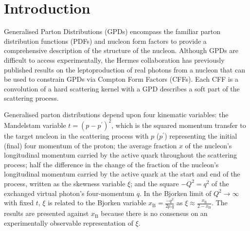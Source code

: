\section{Introduction}
Generalised Parton Distributions (GPDs)
\cite{Mueller1994,Ji1997a,Radyushkin1996} encompass the familiar parton
distribution functions (PDFs) and nucleon form factors to provide a
comprehensive description of the structure of the nucleon.
Although GPDs are difficult to access experimentally, the H{\sc ermes}
collaboration has previously published results
\cite{2009a,2010,CollaborationPhys.Rev.D75:0111032007,HERMEScollaboration2010,HERMESCollaborationPhys.Rev.Lett.87:1820012001} on
the leptoproduction of real photons from a nucleon that can be used to
constrain GPDs via Compton Form Factors (CFFs). Each CFF is a convolution of a
hard scattering kernel with a GPD  describes a soft part of the scattering
process.

Generalised parton distributions depend upon four kinematic variables: the
Mandelstam variable $t=(p-p^{\prime})^2$, which is the squared momentum
transfer to the target nucleon in the scattering process with $p$ ($p^{\prime}$)
representing the initial (final) four momentum of the proton; the average
fraction $x$ of the nucleon's longitudinal momentum carried by the active
quark throughout the scattering process; half the difference in the
change of the fraction of the nucleon's longitudinal momentum carried by the
active quark at the start and end of the process, written as the skewness
variable $\xi$; and the square $-Q^2=q^2$ of the exchanged virtual photon's
four-momentum $q$. In the Bjorken limit of $Q^2\rightarrow\infty$ with
fixed $t$, $\xi$ is related to the Bjorken variable
$x_{\textrm{B}}=\frac{-q^2}{2p.q}$ as
$\xi\approx\frac{x_\textrm{B}}{2-x_\textrm{B}}$. The results are presented
against $x_{\textrm{B}}$ because there is no consensus on an experimentally
observable representation of $\xi$. 

